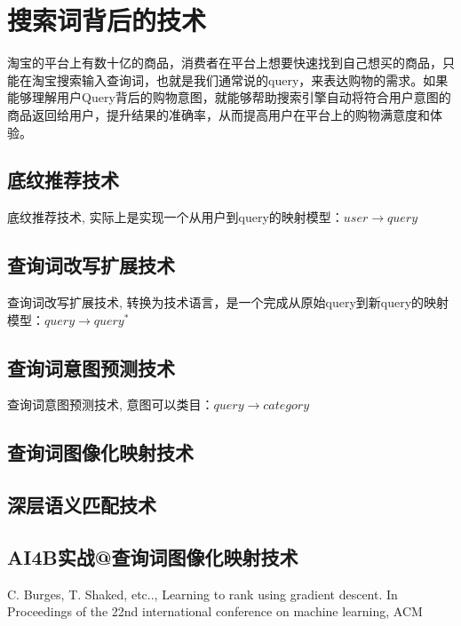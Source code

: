 
\chapter{搜索词背后的技术}
\thispagestyle{empty}

\setlength{\fboxrule}{0pt}\setlength{\fboxsep}{0cm}
\noindent\shadowbox{
\begin{tcolorbox}[arc=0mm,colback=lightblue,colframe=darkblue,title=学习目标与要求]

\end{tcolorbox}}
\setlength{\fboxrule}{1pt}\setlength{\fboxsep}{4pt} 

淘宝的平台上有数十亿的商品，消费者在平台上想要快速找到自己想买的商品，只能在淘宝搜索输入查询词，也就是我们通常说的query，来表达购物的需求。如果能够理解用户Query背后的购物意图，就能够帮助搜索引擎自动将符合用户意图的商品返回给用户，提升结果的准确率，从而提高用户在平台上的购物满意度和体验。

\section{底纹推荐技术} 
	底纹推荐技术, 实际上是实现一个从用户到query的映射模型：$user \to query$

\section{查询词改写扩展技术}
	查询词改写扩展技术, 转换为技术语言，是一个完成从原始query到新query的映射模型：$query \to query^*$
\section{查询词意图预测技术}
查询词意图预测技术, 意图可以类目：$query \to category$


\section{查询词图像化映射技术} 


\section{深层语义匹配技术} 


\section{AI4B实战@查询词图像化映射技术} 


\begin{thebibliography}{99}
 C. Burges, T. Shaked, etc.., Learning to rank 
using gradient descent. In Proceedings of the 22nd international 
conference on machine learning, ACM
\end{thebibliography}

 
